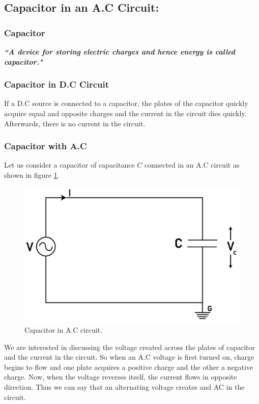 \subsection{Capacitor in an A.C Circuit:}
\subsubsection{Capacitor}
\textit{\textbf{``A device for storing electric charges and hence energy
is called capacitor."}}
\subsubsection{Capacitor in D.C Circuit}
If a D.C source is connected to a capacitor, the plates of the
capacitor quickly acquire equal and opposite charges and the
current in the circuit dies quickly. Afterwards, there is no
current in the circuit.
\subsubsection{Capacitor with A.C}
Let us consider a capacitor of capacitance $C$ connected in an A.C
circuit as shown in figure \ref{fig:15.11}.
\begin{figure}[H]
    \centering
    \includegraphics[scale = 0.8]{Images/Chapter-15/15.11}
    \caption{Capacitor in A.C circuit.}
    \label{fig:15.11}
\end{figure}
We are interested in discussing the voltage created across the plates
of capacitor and the current in the circuit. So when an A.C voltage
is first turned on, charge begins to flow and one plate acquires a
positive charge and the other a negative charge. Now, when the voltage
reverses itself, the current flows in opposite direction.
Thus we can say that an alternating voltage creates and AC in the circuit.

